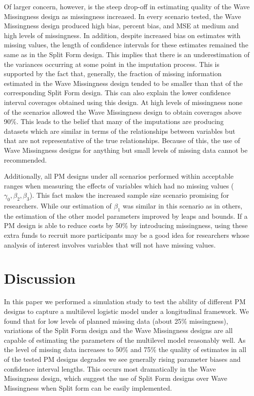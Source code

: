 \documentclass{svjour3}\usepackage[]{graphicx}\usepackage[]{color}
\begin{document}
Of larger concern, however, is the steep drop-off in estimating quality of the Wave Missingness design as missingness increased. In every scenario tested, the Wave Missingness design produced high bias, percent bias, and MSE at medium and high levels of missingness. In addition, despite increased bias on estimates with missing values, the length of confidence intervals for these estimates remained the same as in the Split Form design. This implies that there is an underestimation of the variances occurring at some point in the imputation process. This is supported by the fact that, generally, the fraction of missing information estimated in the Wave Missingness design tended to be smaller than that of the corresponding Split Form design. This can also explain the lower confidence interval coverages obtained using this design. At high levels of missingness none of the scenarios allowed the Wave Missingness design to obtain coverages above 90\%. This leads to the belief that many of the imputations are producing datasets which are similar in terms of the relationships between variables but that are not representative of the true relationships. Because of this, the use of Wave Missingness designs for anything but small levels of missing data cannot be recommended. \par

Additionally, all PM designs under all scenarios performed within acceptable ranges when measuring the effects of variables which had no missing values ($\gamma_0, \beta_2, \beta_3$). This fact makes the increased sample size scenario promising for researchers. While our estimation of $\beta_1$ was similar in this scenario as in others, the estimation of the other model parameters improved by leaps and bounds. If a PM design is able to reduce costs by 50\% by introducing missingness, using these extra funds to recruit more participants may be a good idea for researchers whose analysis of interest involves variables that will not have missing values. \par

\section{Discussion}
\label{4}
In this paper we performed a simulation study to test the ability of different PM designs to capture a multilevel logistic model under a longitudinal framework. We found that for low levels of planned missing data (about 25\% missingness), variations of the Split Form design and the Wave Missingness designs are all capable of estimating the parameters of the multilevel model reasonably well. As the level of missing data increases to 50\% and 75\% the quality of estimates in all of the tested PM designs degrades we see generally rising parameter biases and confidence interval lengths. This occurs most dramatically in the Wave Missingness design, which suggest the use of Split Form designs over Wave Missingness when Split form can be easily implemented.  \par
\end{document}
